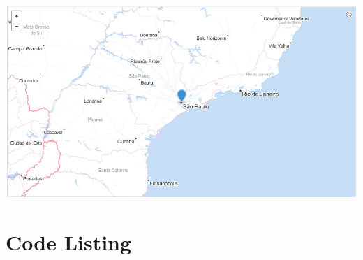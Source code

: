 	\begin{minipage}{\linewidth}
		\centering
			\includegraphics[scale=0.55]{figures/q4/geojsonDay2}
		\label{wordCount}
	\end{minipage}	

\newpage
\section{Code Listing}

